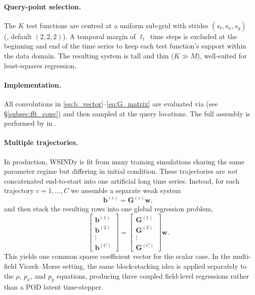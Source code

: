 \documentclass{report}
\theoremstyle{plain}
\theoremstyle{remark}
\numberwithin{equation}{section}              %
\begin{document}
\paragraph{Query-point selection.}
The $K$ test functions are centred at a uniform sub-grid with strides
$(s_t,s_x,s_y)$ (, default $(2,2,2)$).  A temporal margin
of $\ell_t$~time steps is excluded at the beginning and end of the
time series to keep each test function's support within the data domain.
The resulting system is tall and thin ($K\gg M$), well-suited for
least-squares regression.

\paragraph{Implementation.}
All convolutions in \eqref{eq:b_vector}--\eqref{eq:G_matrix} are
evaluated via  (see \S\ref{subsec:fft_conv})
and then sampled at the query locations.  The full assembly is performed by
 in .

\paragraph{Multiple trajectories.}
In production, WSINDy is fit from many training simulations sharing the same
parameter regime but differing in initial condition.  These trajectories are
\emph{not} concatenated end-to-start into one artificial long time series.
Instead, for each trajectory $c=1,\dots,C$ we assemble a separate weak system
\[
  \mathbf{b}^{(c)} = \mathbf{G}^{(c)}\mathbf{w},
\]
and then stack the resulting rows into one global regression problem,
\begin{equation}
  \begin{bmatrix}
    \mathbf{b}^{(1)}\\
    \mathbf{b}^{(2)}\\
    \vdots\\
    \mathbf{b}^{(C)}
  \end{bmatrix}
  =
  \begin{bmatrix}
    \mathbf{G}^{(1)}\\
    \mathbf{G}^{(2)}\\
    \vdots\\
    \mathbf{G}^{(C)}
  \end{bmatrix}
  \mathbf{w}.
  \label{eq:stacked_weak_system}
\end{equation}
This yields one common sparse coefficient vector for the scalar case.  In the
multi-field Vicsek--Morse setting, the same block-stacking idea is applied
separately to the $\rho$, $p_x$, and $p_y$ equations, producing three coupled
field-level regressions rather than a POD latent time-stepper.
\end{document}
